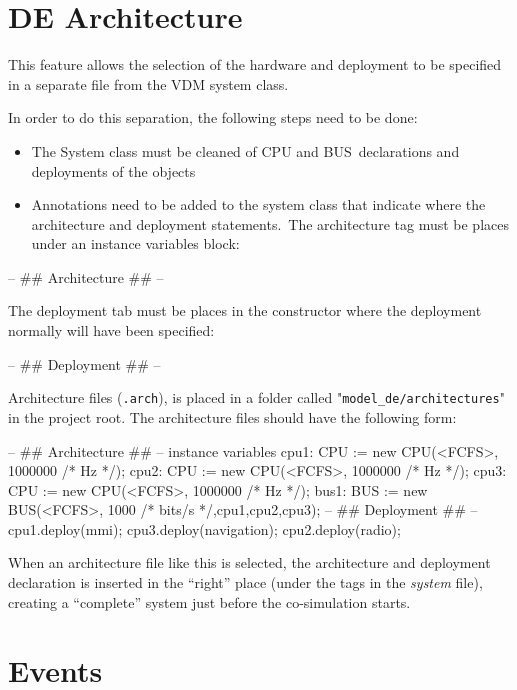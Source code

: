 \documentclass{crescendorepchap}
\begin{document}
\section{DE Architecture}\label{sec:DEArch}

This feature allows the selection of the hardware and deployment to be
specified in a separate file from the VDM system class.

In order to do this separation, the following steps need to be done:

\begin{itemize}
\item
  The System class must be cleaned of CPU and BUS~declarations and
  deployments of the objects
\item
  Annotations need to be added to the system class that indicate where
  the architecture and deployment statements.~The architecture tag must
  be places under an instance variables block:
\end{itemize}

\begin{vdmrt}
-- ## Architecture ## -- 
\end{vdmrt}

The deployment tab must be places in the constructor where the
deployment normally will have been specified:

\begin{vdmrt}
-- ## Deployment ## -- 
\end{vdmrt}

Architecture files (\texttt{.arch}), is placed in a folder called
"\texttt{model\_de/architectures}" in the project root. The
architecture files should have the following form:

\begin{vdmrt}
-- ## Architecture ## --
instance variables
cpu1: CPU := new CPU(<FCFS>, 1000000 /* Hz */);
cpu2: CPU := new CPU(<FCFS>, 1000000 /* Hz */);
cpu3: CPU := new CPU(<FCFS>, 1000000 /* Hz */);
bus1: BUS := new BUS(<FCFS>, 1000 /* bits/s */,{cpu1,cpu2,cpu3});
-- ## Deployment ## --
cpu1.deploy(mmi);
cpu3.deploy(navigation);
cpu2.deploy(radio);
\end{vdmrt}

When an architecture file like this is selected, the architecture and
deployment declaration is inserted in the ``right'' place (under the
tags in the \emph{system} file), creating a ``complete'' system just
before the co-simulation starts.

\section{Events}
\end{document}

